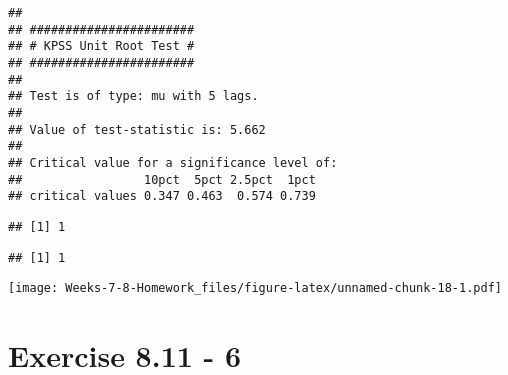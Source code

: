 \documentclass[]{article}
\newenvironment{Shaded}{\begin{snugshade}}{\end{snugshade}}
\newcommand{\DataTypeTok}[1]{\textcolor[rgb]{0.13,0.29,0.53}{#1}}
\newcommand{\KeywordTok}[1]{\textcolor[rgb]{0.13,0.29,0.53}{\textbf{#1}}}
\newcommand{\NormalTok}[1]{#1}
\newcommand{\OperatorTok}[1]{\textcolor[rgb]{0.81,0.36,0.00}{\textbf{#1}}}
\newcommand{\StringTok}[1]{\textcolor[rgb]{0.31,0.60,0.02}{#1}}
\begin{document}
\begin{verbatim}
## 
## ####################### 
## # KPSS Unit Root Test # 
## ####################### 
## 
## Test is of type: mu with 5 lags. 
## 
## Value of test-statistic is: 5.662 
## 
## Critical value for a significance level of: 
##                 10pct  5pct 2.5pct  1pct
## critical values 0.347 0.463  0.574 0.739
\end{verbatim}

\begin{Shaded}
\end{Shaded}

\begin{verbatim}
## [1] 1
\end{verbatim}

\begin{Shaded}
\end{Shaded}

\begin{verbatim}
## [1] 1
\end{verbatim}

\begin{Shaded}
\end{Shaded}

\texttt{[image: Weeks-7-8-Homework\_files/figure-latex/unnamed-chunk-18-1.pdf]}

\newpage

\hypertarget{exercise-8.11---6}{%
\section{Exercise 8.11 - 6}\label{exercise-8.11---6}}
\end{document}
